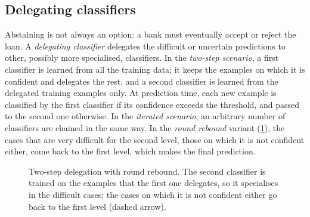 \subsection{Delegating classifiers}

Abstaining is not always an option: a bank must eventually accept or reject the loan. A
\emph{delegating classifier} \citep{ferri2004delegating} delegates the difficult or uncertain
predictions to other, possibly more specialised, classifiers. In the \emph{two-step scenario}, a
first classifier is learned from all the training data; it keeps the examples on which it is
confident and delegates the rest, and a second classifier is learned from the delegated training
examples only. At prediction time, each new example is classified by the first classifier if its
confidence exceeds the threshold, and passed to the second one otherwise. In the \emph{iterated
scenario}, an arbitrary number of classifiers are chained in the same way. In the \emph{round
rebound} variant (\cref{fig:delegation}), the cases that are very difficult for the second level,
those on which it is not confident either, come back to the first level, which makes the final
prediction.

\begin{figure}[htbp]
\centering
{}
\caption{Two-step delegation with round rebound. The second classifier is trained on the
examples that the first one delegates, so it specialises in the difficult cases; the cases on
which it is not confident either go back to the first level (dashed arrow).}
\label{fig:delegation}
\end{figure}

